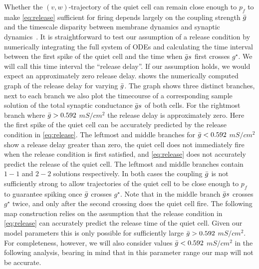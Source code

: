 \documentclass[../manuscript.tex]{subfiles}
\begin{document}
Whether the $(v,w)$-trajectory of the quiet cell can remain close enough to $p_{f}$ to make \cref{eq:release} sufficient for firing depends largely on the coupling strength $\bar g$ and the timescale disparity between membrane dynamics and synaptic dynamics~\citep{bose2011}.
It is straightforward to test our assumption of a release condition by numerically integrating the full system of ODEs and calculating the time interval between the first spike of the quiet cell and the time when $\bar g s$ first crosses $g^{\star}$.
We will call this time interval the ``release delay''.
If our assumption holds, we would expect an approximately zero release delay.
 shows the numerically computed graph of the release delay for varying $\bar g$.
The graph shows three distinct branches, next to each branch we also plot the timecourse of a corresponding sample solution of the total synaptic conductance $\bar g s$ of both cells.
For the rightmost branch where $\bar g>0.592$ $\si{mS/cm^{2}}$ the release delay is approximately zero.
Here the first spike of the quiet cell can be accurately predicted by the release condition in \cref{eq:release}.
The leftmost and middle branches for $\bar g<0.592$ $\si{mS/cm^{2}}$  show a release delay greater than zero, the quiet cell does not immediately fire when the release condition is first satisfied, and \cref{eq:release} does not accurately predict the release of the quiet cell.
The leftmost and middle branches contain $1-1$ and $2-2$ solutions respectively.
In both cases the coupling $\bar g$ is not sufficiently strong to allow trajectories of the quiet cell to be close enough to $p_{f}$ to guarantee spiking once $\bar g$ crosses $g^{\star}$.
Note that in the middle branch $\bar g s $ crosses $g^{\star}$ twice, and only after the second crossing does the quiet cell fire.
The following map construction relies on the assumption that the release condition in \cref{eq:release} can accurately predict the release time of the quiet cell.
Given our model parameters this is only possible for sufficiently large $\bar g>0.592 $ $\si{mS/cm^{2}}$.
For completeness, however, we will also consider values $\bar g < 0.592$ $\si{mS/cm^{2}}$ in the following analysis, bearing in mind that in this parameter range our map will not be accurate.
\end{document}
